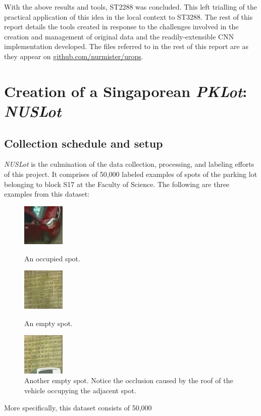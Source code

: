 \documentclass[a4paper, 11pt]{article} %
\begin{document}
	With the above results and tools, ST2288 was concluded. This left trialling of the practical 
	application of this idea in the local context to ST3288. The rest of this 
	report details the tools created in response to the challenges involved in 
	the creation and management of original data and the readily-extensible 
	CNN implementation developed. The files referred to in the rest of this 
	report are as they appear on 
	\hyperlink{https://github.com/nurmister/urops}{github.com/nurmister/urops}.
\section{Creation of a Singaporean \textit{PKLot}: \textit{NUSLot}}
	\subsection{Collection schedule and setup}
		\textit{NUSLot} is the culmination of the data collection, processing, and labeling efforts of this 
		project. It comprises of 50,000 labeled examples of spots of the 
		parking lot belonging to block 
		S17 at the Faculty of Science. The following are 
		three examples from this dataset:
		\vskip 5mm
		\begin{figure}[H]
			\centering
			\includegraphics[width=2cm]{figures/nuslot_example_1.jpg}
			\caption{An occupied spot.}
			\vspace{5mm}
			\includegraphics[width=2cm]{figures/nuslot_example_2.jpg}
			\caption{An empty spot.}
			\vspace{5mm}
			\includegraphics[width=2cm]{figures/nuslot_example_3.jpg}
			\caption{Another empty spot. Notice the occlusion caused by the roof of the vehicle occupying 
			the adjacent spot.}
		\end{figure}
		\hspace*{-6mm}More specifically, this dataset consists of 50,000 
\end{document}
